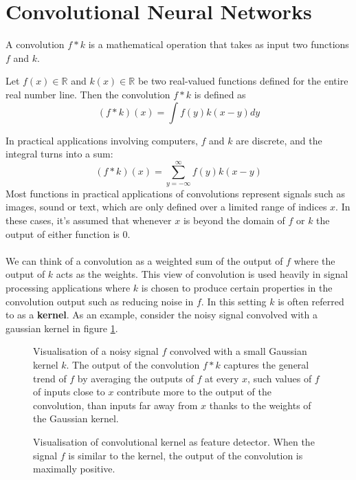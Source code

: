 \section{Convolutional Neural Networks}
A convolution $f * k$ is a mathematical operation that takes as input two functions $f$ and $k$.

\begin{definition}[convolution] \label{convolution}
	Let $f(x) \in \mathbb{R}$ and $k(x) \in \mathbb{R}$ be two real-valued functions defined for the entire real number line. Then the convolution $f * k$ is defined as
	$$
		(f * k)(x) = \int f(y)k(x - y)dy
	$$
\end{definition}

In practical applications involving computers, $f$ and $k$ are discrete, and the integral turns into a sum:
$$
(f * k)(x) = \sum\limits_{y=-\infty}^\infty f(y)k(x - y)
$$
Most functions in practical applications of convolutions represent signals such as images, sound or text, which are only defined over a limited range of indices $x$. In these cases, it's assumed that whenever $x$ is beyond the domain of $f$ or $k$ the output of either function is 0.
\\\\
We can think of a convolution as a weighted sum of the output of $f$ where the output of $k$ acts as the weights. This view of convolution is used heavily in signal processing applications where $k$ is chosen to produce certain properties in the convolution output such as reducing noise in $f$. In this setting $k$ is often referred to as a \textbf{kernel}. As an example, consider the noisy signal convolved with a gaussian kernel in figure \ref{gaussian_convolution}.

\begin{figure}
	\centering
	
	\caption{Visualisation of a noisy signal $f$ convolved with a small Gaussian kernel $k$. The output of the convolution $f * k$ captures the general trend of $f$ by averaging the outputs of $f$ at every $x$, such values of $f$ of inputs close to $x$ contribute more to the output of the convolution, than inputs far away from $x$ thanks to the weights of the Gaussian kernel.}
	\label{gaussian_convolution}
\end{figure}

\begin{figure}
	\centering
	
	\caption{Visualisation of convolutional kernel as feature detector. When the signal $f$ is similar to the kernel, the output of the convolution is maximally positive.}
	\label{feature_detector}
\end{figure}

